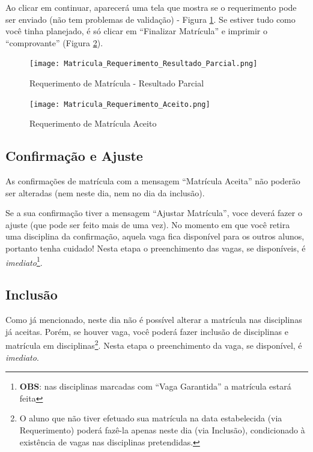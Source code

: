 \documentclass[a4paper,12pt,openany]{article}
\begin{document}
Ao clicar em continuar, aparecerá uma tela que mostra se o requerimento pode ser enviado (não tem problemas de validação) - Figura \ref{matriculaRequerimentoResultadoParcial}. Se estiver tudo como você tinha planejado, é só clicar em ``Finalizar Matrícula'' e imprimir o ``comprovante'' (Figura \ref{matriculaRequerimentoAceito}).

	\begin{figure}[ht!]  \centering
		\texttt{[image: Matricula\_Requerimento\_Resultado\_Parcial.png]}
		\caption{Requerimento de Matrícula - Resultado Parcial}
		\label{matriculaRequerimentoResultadoParcial}
	\end{figure}

	\begin{figure}[ht!]  \centering
		\texttt{[image: Matricula\_Requerimento\_Aceito.png]}
		\caption{Requerimento de Matrícula Aceito}
		\label{matriculaRequerimentoAceito}
	\end{figure}

\newpage

\subsection{Confirmação e Ajuste}
As confirmações de matrícula com a mensagem ``Matrícula Aceita'' não poderão ser alteradas (nem neste dia, nem no dia da inclusão).

Se a sua confirmação tiver a mensagem ``Ajustar Matrícula'', voce deverá fazer o ajuste (que pode ser feito mais de uma vez). No momento em que você retira uma disciplina da confirmação, aquela vaga fica disponível para os outros alunos, portanto tenha cuidado! Nesta etapa o preenchimento das vagas, se disponíveis, é \textit{imediato}\footnote{ \textbf{OBS}: nas disciplinas  marcadas com ``Vaga Garantida''  a matrícula estará feita}.

\subsection{Inclusão}

Como já mencionado, neste dia não é possível alterar a matrícula nas disciplinas já aceitas. Porém, se houver vaga, você poderá fazer inclusão de disciplinas e matrícula em disciplinas\footnote{O aluno que não tiver efetuado sua matrícula na data estabelecida (via Requerimento) poderá fazê-la apenas neste dia (via Inclusão), condicionado à existência de vagas nas disciplinas pretendidas.}.
Nesta etapa o preenchimento da vaga, se disponível, é \textit{imediato}.
\end{document}
